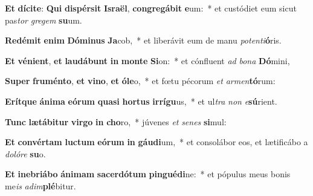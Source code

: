 \item \textbf{Et} \textbf{dí}\textbf{ci}\textbf{te}: \textbf{Qui} \textbf{di}\textbf{spér}\textbf{sit} \textbf{Is}\textbf{ra}\textbf{ël}, \textbf{con}\textbf{gre}\textbf{gá}\textbf{bit} \textbf{e}um:~* et custódiet eum sicut pas\textit{tor} \textit{gre}\textit{gem} \textbf{su}um.
\item \textbf{Red}\textbf{é}\textbf{mit} \textbf{e}\textbf{nim} \textbf{Dó}\textbf{mi}\textbf{nus} \textbf{Ja}cob,~* et liberávit eum de manu \textit{pot}\textit{en}\textit{ti}\textbf{ó}ris.
\item \textbf{Et} \textbf{vé}\textbf{ni}\textbf{ent}, \textbf{et} \textbf{lau}\textbf{dá}\textbf{bunt} \textbf{in} \textbf{mon}\textbf{te} \textbf{Si}on:~* et cónfluent \textit{ad} \textit{bo}\textit{na} \textbf{Dó}mini,
\item \textbf{Su}\textbf{per} \textbf{fru}\textbf{mén}\textbf{to}, \textbf{et} \textbf{vi}\textbf{no}, \textbf{et} \textbf{ó}\textbf{le}o,~* et fœtu pécorum \textit{et} \textit{ar}\textit{men}\textbf{tó}rum:
\item \textbf{E}\textbf{rít}\textbf{que} \textbf{á}\textbf{ni}\textbf{ma} \textbf{e}\textbf{ó}\textbf{rum} \textbf{qua}\textbf{si} \textbf{hor}\textbf{tus} \textbf{ir}\textbf{rí}\textbf{gu}us,~* et ul\textit{tra} \textit{non} \textit{e}\textbf{sú}rient.
\item \textbf{Tunc} \textbf{læ}\textbf{tá}\textbf{bi}\textbf{tur} \textbf{vir}\textbf{go} \textbf{in} \textbf{cho}ro,~* júvenes \textit{et} \textit{se}\textit{nes} \textbf{si}mul:
\item \textbf{Et} \textbf{con}\textbf{vér}\textbf{tam} \textbf{luc}\textbf{tum} \textbf{e}\textbf{ó}\textbf{rum} \textbf{in} \textbf{gáu}\textbf{di}um,~* et consolábor eos, et lætificábo a \textit{do}\textit{ló}\textit{re} \textbf{su}o.
\item \textbf{Et} \textbf{in}\textbf{e}\textbf{bri}\textbf{á}\textbf{bo} \textbf{á}\textbf{ni}\textbf{mam} \textbf{sa}\textbf{cer}\textbf{dó}\textbf{tum} \textbf{pin}\textbf{gué}\textbf{di}ne:~* et pópulus meus bonis me\textit{is} \textit{ad}\textit{im}\textbf{plé}bitur.

